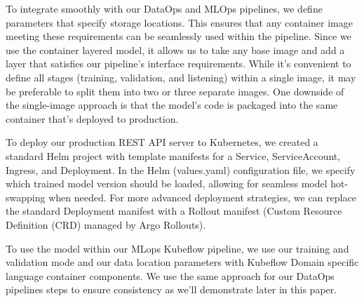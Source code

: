 To integrate smoothly with our DataOps and MLOps pipelines, we define parameters that specify storage locations.
This ensures that any container image meeting these requirements can be seamlessly used within the pipeline.
Since we use the container layered model, it allows us to take any base image and add a layer that satisfies our pipeline's interface requirements.
While it's convenient to define all stages (training, validation, and listening) within a single image, it may be preferable to split them into two or three separate images.
One downside of the single-image approach is that the model's code is packaged into the same container that's deployed to production.

To deploy our production REST API server to Kubernetes, we created a standard Helm project with template manifests for a Service,
ServiceAccount, Ingress, and Deployment.
In the Helm (values.yaml) configuration file, we specify which trained model version should be loaded, allowing for seamless model hot-swapping when needed.
For more advanced deployment strategies, we can replace the standard Deployment manifest with a Rollout manifest (Custom Resource Definition (CRD) managed by Argo Rollouts).

To use the model within our MLops Kubeflow pipeline, we use our training and validation mode and our data location parameters with Kubeflow Domain specific language container components.
We use the same approach for our DataOps pipelines steps to ensure consistency as we'll demonstrate later in this paper.



